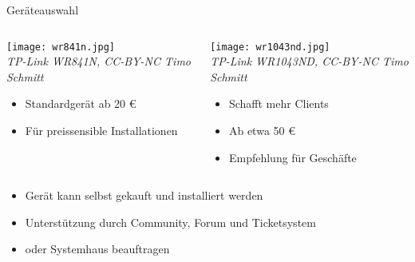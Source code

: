 \documentclass{beamer}
\begin{document}
\begin{frame}{Geräteauswahl}
	\begin{columns}
		\begin{column}{0.45\textwidth}
			\texttt{[image: wr841n.jpg]}\\
			\vspace*{-2.0mm}\textit{\tiny TP-Link WR841N, CC-BY-NC Timo Schmitt}
			\begin{itemize}
				\item Standardgerät ab 20 \euro
				\item Für preissensible Installationen
			\end{itemize}

			
		\end{column}
		\begin{column}{0.45\textwidth}
			\texttt{[image: wr1043nd.jpg]}\\
			\vspace*{-2.0mm}\textit{\tiny TP-Link WR1043ND, CC-BY-NC Timo Schmitt}
			\begin{itemize}
				\item Schafft mehr Clients 
				\item Ab etwa 50 \euro
				\item Empfehlung für Geschäfte
			\end{itemize}
			
		\end{column}
	\end{columns}
\end{frame}
\begin{frame}
	\begin{itemize}
		\item Gerät kann selbst gekauft und installiert werden
		\item Unterstützung durch Community, Forum und Ticketsystem
		\item oder Systemhaus beauftragen
	\end{itemize}
\end{frame}
\end{document}
